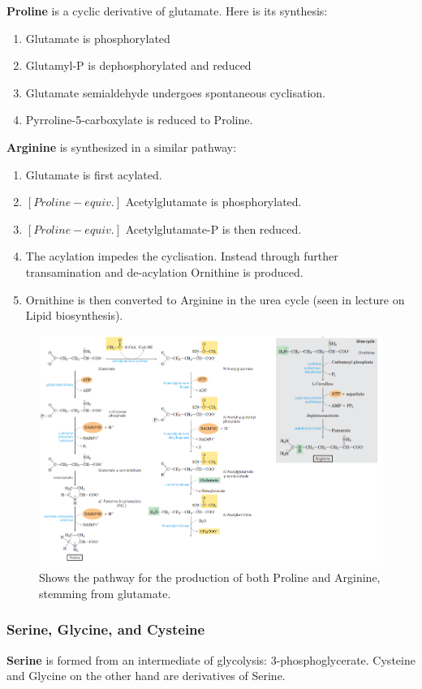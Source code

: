 \documentclass[../main.tex]{subfiles}
\begin{document}
\textbf{\gls{Proline}} is a cyclic derivative of glutamate. Here is its synthesis:
\begin{enumerate}
	\item Glutamate is phosphorylated
	\item Glutamyl-P is dephosphorylated and reduced
	\item Glutamate semialdehyde undergoes spontaneous cyclisation.
	\item Pyrroline-5-carboxylate is reduced to Proline.
\end{enumerate}

\textbf{\gls{Arginine}} is synthesized in a similar pathway:
\begin{enumerate}
	\item Glutamate is first acylated.
	\item $[Proline-equiv.]$ Acetylglutamate is phosphorylated.
	\item $[Proline-equiv.]$ Acetylglutamate-P is then reduced.
	\item The acylation impedes the cyclisation. Instead through further transamination and de-acylation Ornithine is produced.
	\item Ornithine is then converted to Arginine in the urea cycle (seen in lecture on Lipid biosynthesis).
\end{enumerate}

\begin{figure}[H]
	\centering
	\includegraphics[width=0.6\linewidth]{pro_arg}
	\caption{Shows the pathway for the production of both Proline and Arginine, stemming from glutamate.}
	\label{fig:proarg}
\end{figure}


\subsubsection{Serine, Glycine, and Cysteine}

\textbf{\gls{Serine}} is formed from an intermediate of glycolysis: 3-phosphoglycerate. Cysteine and Glycine on the other hand are derivatives of Serine. \\
\end{document}
